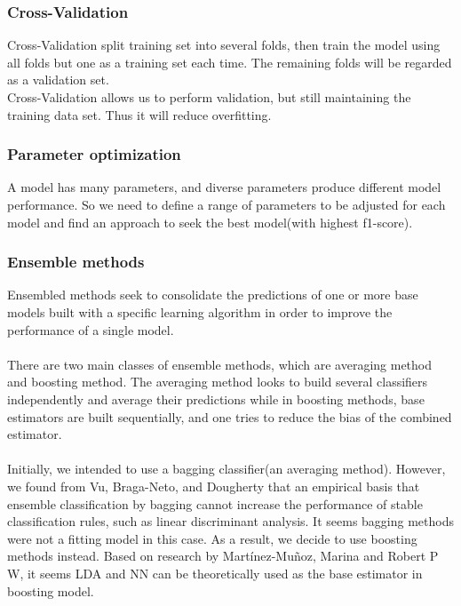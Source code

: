 \documentclass{article}
\begin{document}
\subsubsection{Cross-Validation}
Cross-Validation split training set into several folds, then train the model using all folds but one as a training set each time. The remaining folds will be regarded as a validation set. \\
Cross-Validation allows us to perform validation, but still maintaining the training data set. Thus it will reduce overfitting.

\subsubsection{Parameter optimization}
A model has many parameters, and diverse parameters produce different model performance. So we need to define a range of parameters to be adjusted for each model and find an approach to seek the best model(with highest f1-score).
 
\subsubsection{Ensemble methods}
Ensembled methods seek to consolidate the predictions of one or more base models built with a specific learning algorithm in order to improve the performance of a single model.\\\\
There are two main classes of ensemble methods, which are averaging method and boosting method. The averaging method looks to build several classifiers independently and average their predictions while in boosting methods, base estimators are built sequentially, and one tries to reduce the bias of the combined estimator.\\\\
Initially, we intended to use a bagging classifier(an averaging method). However, we found from Vu, Braga-Neto, and Dougherty \cite{4}that an empirical basis that ensemble classification by bagging cannot increase the performance of stable classification rules, such as linear discriminant analysis. It seems bagging methods were not a fitting model in this case. As a result, we decide to use boosting methods instead. Based on research by Martínez-Muñoz\cite{3}, Marina and Robert P W\cite{2}, it seems LDA and NN can be theoretically used as the base estimator in boosting model.




\end{document}
